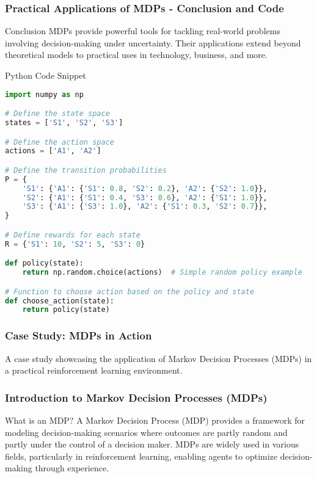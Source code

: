 \documentclass[aspectratio=169]{beamer}
\begin{document}
\begin{frame}[fragile]
    \frametitle{Practical Applications of MDPs - Conclusion and Code}
    \begin{block}{Conclusion}
        MDPs provide powerful tools for tackling real-world problems involving decision-making under uncertainty. Their applications extend beyond theoretical models to practical uses in technology, business, and more.
    \end{block}

    \begin{block}{Python Code Snippet}
    \begin{lstlisting}[language=Python]
import numpy as np

# Define the state space
states = ['S1', 'S2', 'S3']

# Define the action space
actions = ['A1', 'A2']

# Define the transition probabilities
P = {
    'S1': {'A1': {'S1': 0.8, 'S2': 0.2}, 'A2': {'S2': 1.0}},
    'S2': {'A1': {'S1': 0.4, 'S3': 0.6}, 'A2': {'S1': 1.0}},
    'S3': {'A1': {'S3': 1.0}, 'A2': {'S1': 0.3, 'S2': 0.7}},
}

# Define rewards for each state
R = {'S1': 10, 'S2': 5, 'S3': 0}

def policy(state):
    return np.random.choice(actions)  # Simple random policy example

# Function to choose action based on the policy and state
def choose_action(state):
    return policy(state)
    \end{lstlisting}
    \end{block}
\end{frame}

\begin{frame}[fragile]
    \frametitle{Case Study: MDPs in Action}
    A case study showcasing the application of Markov Decision Processes (MDPs) in a practical reinforcement learning environment.
\end{frame}

\begin{frame}[fragile]
    \frametitle{Introduction to Markov Decision Processes (MDPs)}
    \begin{block}{What is an MDP?}
        A Markov Decision Process (MDP) provides a framework for modeling decision-making scenarios where outcomes are partly random and partly under the control of a decision maker. MDPs are widely used in various fields, particularly in reinforcement learning, enabling agents to optimize decision-making through experience.
    \end{block}
\end{frame}
\end{document}
